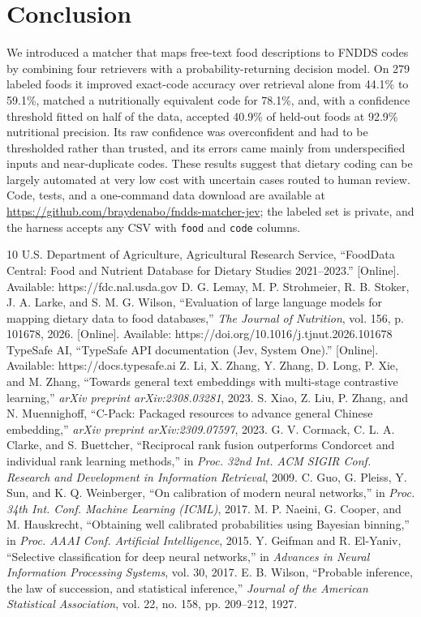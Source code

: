 \documentclass[11pt,journal,onecolumn]{IEEEtran}
\begin{document}
\section{Conclusion}
We introduced a matcher that maps free-text food descriptions to FNDDS codes by combining four retrievers with a probability-returning decision model. On 279 labeled foods it improved exact-code accuracy over retrieval alone from 44.1\% to 59.1\%, matched a nutritionally equivalent code for 78.1\%, and, with a confidence threshold fitted on half of the data, accepted 40.9\% of held-out foods at 92.9\% nutritional precision. Its raw confidence was overconfident and had to be thresholded rather than trusted, and its errors came mainly from underspecified inputs and near-duplicate codes. These results suggest that dietary coding can be largely automated at very low cost with uncertain cases routed to human review. Code, tests, and a one-command data download are available at \url{https://github.com/braydenabo/fndds-matcher-jev}; the labeled set is private, and the harness accepts any CSV with \texttt{food} and \texttt{code} columns.

\begin{thebibliography}{10}
 U.S. Department of Agriculture, Agricultural Research Service, ``FoodData Central: Food and Nutrient Database for Dietary Studies 2021--2023.'' [Online]. Available: https://fdc.nal.usda.gov
 D. G. Lemay, M. P. Strohmeier, R. B. Stoker, J. A. Larke, and S. M. G. Wilson, ``Evaluation of large language models for mapping dietary data to food databases,'' \emph{The Journal of Nutrition}, vol. 156, p. 101678, 2026. [Online]. Available: https://doi.org/10.1016/j.tjnut.2026.101678
 TypeSafe AI, ``TypeSafe API documentation (Jev, System One).'' [Online]. Available: https://docs.typesafe.ai
 Z. Li, X. Zhang, Y. Zhang, D. Long, P. Xie, and M. Zhang, ``Towards general text embeddings with multi-stage contrastive learning,'' \emph{arXiv preprint arXiv:2308.03281}, 2023.
 S. Xiao, Z. Liu, P. Zhang, and N. Muennighoff, ``C-Pack: Packaged resources to advance general Chinese embedding,'' \emph{arXiv preprint arXiv:2309.07597}, 2023.
 G. V. Cormack, C. L. A. Clarke, and S. Buettcher, ``Reciprocal rank fusion outperforms Condorcet and individual rank learning methods,'' in \emph{Proc. 32nd Int. ACM SIGIR Conf. Research and Development in Information Retrieval}, 2009.
 C. Guo, G. Pleiss, Y. Sun, and K. Q. Weinberger, ``On calibration of modern neural networks,'' in \emph{Proc. 34th Int. Conf. Machine Learning (ICML)}, 2017.
 M. P. Naeini, G. Cooper, and M. Hauskrecht, ``Obtaining well calibrated probabilities using Bayesian binning,'' in \emph{Proc. AAAI Conf. Artificial Intelligence}, 2015.
 Y. Geifman and R. El-Yaniv, ``Selective classification for deep neural networks,'' in \emph{Advances in Neural Information Processing Systems}, vol. 30, 2017.
 E. B. Wilson, ``Probable inference, the law of succession, and statistical inference,'' \emph{Journal of the American Statistical Association}, vol. 22, no. 158, pp. 209--212, 1927.
\end{thebibliography}
\end{document}
